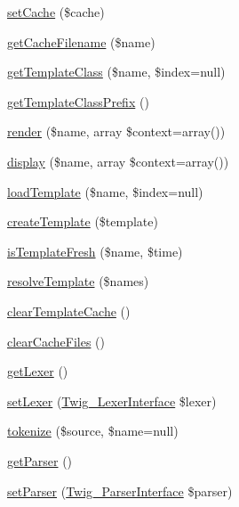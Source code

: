 \begin{DoxyCompactItemize}
\hyperlink{class_twig___environment_a1bfa0b30d50d9ccce38cd1bcf2375109}{set\+Cache} (\$cache)
\item 
\hyperlink{class_twig___environment_a453c3932d4a4b360c9c46216a0a762c4}{get\+Cache\+Filename} (\$name)
\item 
\hyperlink{class_twig___environment_a4949e6cb86c3444141918d26d1e6c741}{get\+Template\+Class} (\$name, \$index=null)
\item 
\hyperlink{class_twig___environment_a996a70040832913180f69561952d5be5}{get\+Template\+Class\+Prefix} ()
\item 
\hyperlink{class_twig___environment_a8f5169d8953835c0a313d3a62344ce58}{render} (\$name, array \$context=array())
\item 
\hyperlink{class_twig___environment_a09c36679881e4567dd156657559aa314}{display} (\$name, array \$context=array())
\item 
\hyperlink{class_twig___environment_a0641874ee64bc25d356b609b6cda9700}{load\+Template} (\$name, \$index=null)
\item 
\hyperlink{class_twig___environment_a339848673fd347999fa3e538438be8cb}{create\+Template} (\$template)
\item 
\hyperlink{class_twig___environment_a550e54bc7b1aaab7001854bfeea98f72}{is\+Template\+Fresh} (\$name, \$time)
\item 
\hyperlink{class_twig___environment_af1cc34fcbd8561be8a6075517d107630}{resolve\+Template} (\$names)
\item 
\hyperlink{class_twig___environment_a9b6e645c229f4cef3f7bf6e3eca5ae2d}{clear\+Template\+Cache} ()
\item 
\hyperlink{class_twig___environment_a1b98cd192f56b7d2234816b62203edff}{clear\+Cache\+Files} ()
\item 
\hyperlink{class_twig___environment_a41904927ec501424d235015965e8cdee}{get\+Lexer} ()
\item 
\hyperlink{class_twig___environment_aee05c0d74c1194a030f13d7d2e3c1b6f}{set\+Lexer} (\hyperlink{interface_twig___lexer_interface}{Twig\+\_\+\+Lexer\+Interface} \$lexer)
\item 
\hyperlink{class_twig___environment_a69b81a225a371337d9854e72ec3f676d}{tokenize} (\$source, \$name=null)
\item 
\hyperlink{class_twig___environment_a4b6907ea868dc9053e1f7d6260fa4b4f}{get\+Parser} ()
\item 
\hyperlink{class_twig___environment_ac16cd9a5f9db326226c01aa3ee943857}{set\+Parser} (\hyperlink{interface_twig___parser_interface}{Twig\+\_\+\+Parser\+Interface} \$parser)

\end{DoxyCompactItemize}
